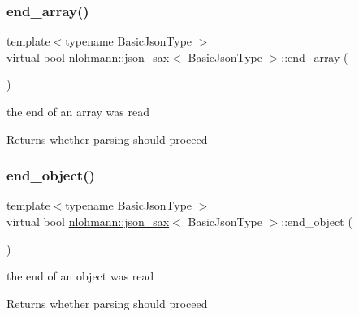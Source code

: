 \subsubsection{\texorpdfstring{end\+\_\+array()}{end\_array()}}
{\footnotesize\ttfamily template$<$typename Basic\+Json\+Type $>$ \\
virtual bool \hyperlink{structnlohmann_1_1json__sax}{nlohmann\+::json\+\_\+sax}$<$ Basic\+Json\+Type $>$\+::end\+\_\+array (\begin{DoxyParamCaption}{ }\end{DoxyParamCaption})\hspace{0.3cm}{\ttfamily [pure virtual]}}



the end of an array was read 

\begin{DoxyReturn}{Returns}
whether parsing should proceed 
\end{DoxyReturn}
\mbox{\label{structnlohmann_1_1json__sax_ad0c722d53ff97be700ccf6a9468bd456}} 
\subsubsection{\texorpdfstring{end\+\_\+object()}{end\_object()}}
{\footnotesize\ttfamily template$<$typename Basic\+Json\+Type $>$ \\
virtual bool \hyperlink{structnlohmann_1_1json__sax}{nlohmann\+::json\+\_\+sax}$<$ Basic\+Json\+Type $>$\+::end\+\_\+object (\begin{DoxyParamCaption}{ }\end{DoxyParamCaption})\hspace{0.3cm}{\ttfamily [pure virtual]}}



the end of an object was read 

\begin{DoxyReturn}{Returns}
whether parsing should proceed 
\end{DoxyReturn}
\mbox{\label{structnlohmann_1_1json__sax_a2e0c7ecd80b18d18a8cc76f71cfc2028}} 
